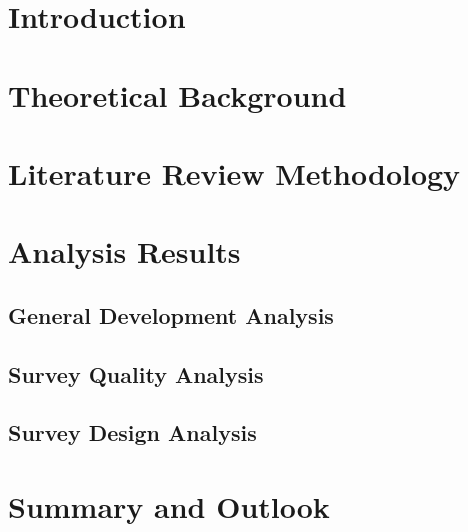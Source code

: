 \documentclass[12pt,a4paper]{article}
\begin{document}
\newpage



\section{Introduction}
\label{01_introduction}


\section{Theoretical Background}
\label{02_theoretical_background}


\section{Literature Review Methodology}
\label{03_literature_review_methodology}


\section{Analysis Results}
\label{04_analysis_results}

\subsection{General Development Analysis}
\label{04_01_general_development_analysis}


\subsection{Survey Quality Analysis}
\label{04_02_survey_quality_analysis}


\subsection{Survey Design Analysis}
\label{04_04_survey_design_analysis}


\section{Summary and Outlook}
\label{05_summary_and_outlook}


\newpage
\printbibliography
\end{document}
